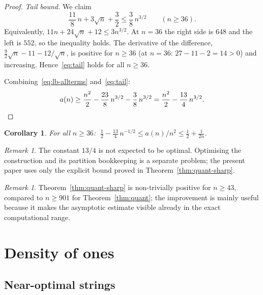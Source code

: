 \documentclass[11pt,a4paper]{article}
\theoremstyle{plain}
\newtheorem{corollary}[theorem]{Corollary}
\theoremstyle{definition}
\theoremstyle{remark}
\newtheorem{remark}[theorem]{Remark}
\begin{document}
\begin{proof}
  \textit{Tail bound.}  We claim
  \begin{equation}\label{eq:tail}
    \frac{11}{8}\,n + 3\sqrt{n} + \frac{3}{2}
    \le \frac{3}{8}\,n^{3/2}
    \qquad (n \ge 36).
  \end{equation}
  Equivalently, $11n + 24\sqrt{n} + 12 \le 3n^{3/2}$.  At $n = 36$
  the right side is $648$ and the left is $552$, so the inequality
  holds.  The derivative of the difference,
  $\frac{9}{2}\sqrt{n} - 11 - 12/\sqrt{n}$, is positive for
  $n \ge 36$ (at $n = 36$: $27 - 11 - 2 = 14 > 0$) and increasing.
  Hence~\eqref{eq:tail} holds for all $n \ge 36$.

  Combining~\eqref{eq:lb-allterms} and~\eqref{eq:tail}:
  \[
    a(n) \ge \frac{n^2}{2} - \frac{23}{8}\,n^{3/2}
    - \frac{3}{8}\,n^{3/2}
    = \frac{n^2}{2} - \frac{13}{4}\,n^{3/2}. \qedhere
  \]
\end{proof}

\begin{corollary}\label{cor:rate}
  For all $n \ge 36$:
  $\;\frac{1}{2} - \frac{13}{4}\,n^{-1/2}
  \le a(n)/n^2
  \le \frac{1}{2} + \frac{1}{2n}$.
\end{corollary}

\begin{remark}\label{rem:optimal-constant}
  The constant $13/4$ is not expected to be optimal.  Optimising the
  construction and its partition bookkeeping is a separate problem; the
  present paper uses only the explicit bound proved in
  Theorem~\ref{thm:quant-sharp}.
\end{remark}

\begin{remark}\label{rem:comparison}
  Theorem~\ref{thm:quant-sharp} is non-trivially positive for
  $n \ge 43$, compared to $n \ge 901$ for Theorem~\ref{thm:quant};
  the improvement is mainly useful because it makes the asymptotic
  estimate visible already in the exact computational range.
\end{remark}

\section{Density of ones}\label{sec:density}

\subsection{Near-optimal strings}
\end{document}
